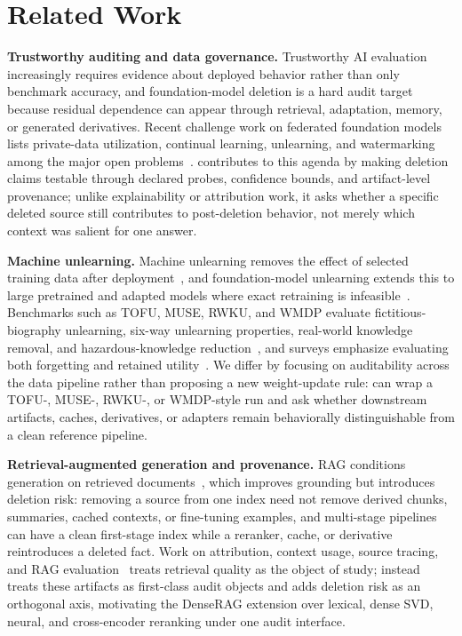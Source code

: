 \section{Related Work}

\textbf{Trustworthy auditing and data governance.}
Trustworthy AI evaluation increasingly requires evidence about deployed behavior rather than only benchmark accuracy, and foundation-model deletion is a hard audit target because residual dependence can appear through retrieval, adaptation, memory, or generated derivatives. Recent challenge work on federated foundation models lists private-data utilization, continual learning, unlearning, and watermarking among the major open problems~\cite{fan2025fedfmchallenges}. \method{} contributes to this agenda by making deletion claims testable through declared probes, confidence bounds, and artifact-level provenance; unlike explainability or attribution work, it asks whether a specific deleted source still contributes to post-deletion behavior, not merely which context was salient for one answer.

\textbf{Machine unlearning.}
Machine unlearning removes the effect of selected training data after deployment~\cite{cao2015machineunlearning,bourtoule2021machineunlearning,ginart2019making}, and foundation-model unlearning extends this to large pretrained and adapted models where exact retraining is infeasible~\cite{yao2024largeunlearning,maini2024tofu,liu2024rethinking,wang2024llmunlearning}. Benchmarks such as TOFU, MUSE, RWKU, and WMDP evaluate fictitious-biography unlearning, six-way unlearning properties, real-world knowledge removal, and hazardous-knowledge reduction~\cite{maini2024tofu,shi2024muse,jin2024rwku,li2024wmdp}, and surveys emphasize evaluating both forgetting and retained utility~\cite{jin2024surveyunlearning}. We differ by focusing on auditability across the data pipeline rather than proposing a new weight-update rule: \method{} can wrap a TOFU-, MUSE-, RWKU-, or WMDP-style run and ask whether downstream artifacts, caches, derivatives, or adapters remain behaviorally distinguishable from a clean reference pipeline.

\textbf{Retrieval-augmented generation and provenance.}
RAG conditions generation on retrieved documents~\cite{lewis2020rag,karpukhin2020dpr,izacard2021fid,gao2024ragsurvey}, which improves grounding but introduces deletion risk: removing a source from one index need not remove derived chunks, summaries, cached contexts, or fine-tuning examples, and multi-stage pipelines can have a clean first-stage index while a reranker, cache, or derivative reintroduces a deleted fact. Work on attribution, context usage, source tracing, and RAG evaluation~\cite{gao2023retrievalaugmented,asai2024selfrag,yu2024ragevalsurvey,akkiraju2024facts} treats retrieval quality as the object of study; \method{} instead treats these artifacts as first-class audit objects and adds deletion risk as an orthogonal axis, motivating the DenseRAG extension over lexical, dense SVD, neural, and cross-encoder reranking under one audit interface.

